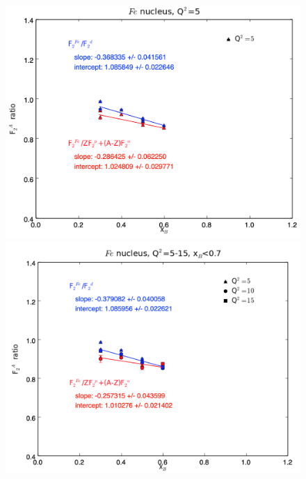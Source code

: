 \documentclass[oneside]{article}
\begin{document}
 \begin{figure}[H]
\begin{minipage}{0.5\textwidth}
 \includegraphics[width=\textwidth]{plots/q2_5/q2_5_Fe.png}
\end{minipage}\hfill\begin{minipage}{0.5\textwidth}
\includegraphics[width=\textwidth]{plots/q2_all_x_l7/q2_all_x_l7_Fe.png}
\end{minipage}\hfill\begin{minipage}{0.5\textwidth}

\end{minipage}
\end{figure}
\end{document}
